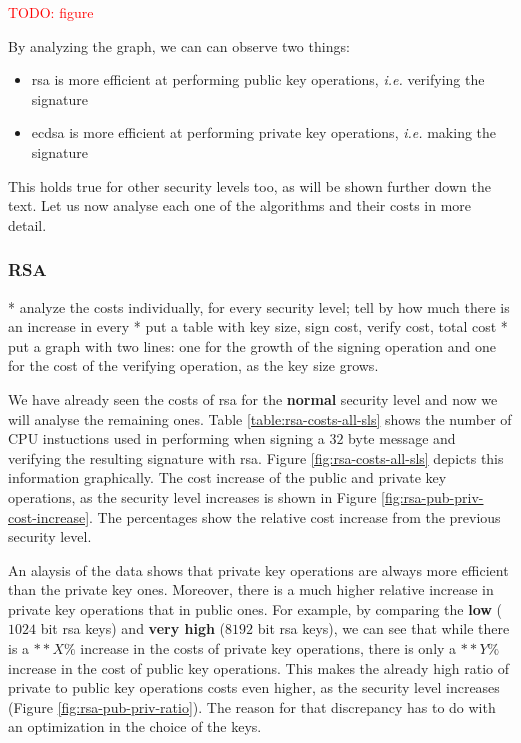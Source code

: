 \documentclass{llncs}
\newcommand{\todo}[1]{\textcolor{red}{TODO: #1}\PackageWarning{TODO:}{#1!}}
\begin{document}
\todo{figure}

By analyzing the graph, we can can observe two things:

\begin{itemize}
  \item \gls{rsa} is more efficient at performing public key operations, \textit{i.e.} verifying the signature
  \item \gls{ecdsa} is more efficient at performing private key operations, \textit{i.e.} making the signature
\end{itemize}

This holds true for other security levels too, as will be shown further down the text. Let us now analyse each one
of the algorithms and their costs in more detail. 

\subsubsection{RSA}
* analyze the costs individually, for every security level; tell by how much there is an increase in every
* put a table with key size, sign cost, verify cost, total cost
* put a graph with two lines: one for the growth of the signing operation and one for the cost of the verifying operation,
as the key size grows.

We have already seen the costs of \gls{rsa} for the \textbf{normal} security level and now we will analyse the
remaining ones. Table \ref{table:rsa-costs-all-sls} shows the number of CPU instuctions used in performing
when signing a $32$ byte message and verifying the resulting signature with \gls{rsa}. Figure \ref{fig:rsa-costs-all-sls}
depicts this information graphically. The cost increase of the public and private key operations, as the security level 
increases is shown in Figure \ref{fig:rsa-pub-priv-cost-increase}. The percentages show the relative cost increase 
from the previous security level.

An alaysis of the data shows that private key operations are always more efficient than the private key ones.
Moreover, there is a much higher relative increase in private key operations that in public ones.
For example, by comparing the \textbf{low} ($1024$ bit \gls{rsa} keys) and \textbf{very high} ($8192$ bit \gls{rsa} keys),
we can see that while there is a $**X\%$ increase in the costs of private key operations, there is only a $**Y\%$
increase in the cost of public key operations. This makes the already high ratio of private to public key operations costs
even higher, as the security level increases (Figure \ref{fig:rsa-pub-priv-ratio}). The reason for that discrepancy has to do with an optimization
in the choice of the keys.
\end{document}

